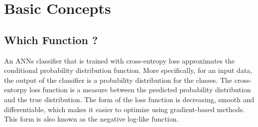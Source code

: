 \documentclass[3p,times,procedia]{elsarticle}
\begin{document}



\enlargethispage{10mm}
\section{\textbf{Basic Concepts}}
\label{main}



\subsection{\textbf{Which Function ?}}

An ANNs classifier that is trained with cross-entropy loss approximates the conditional probability distribution function.
More specifically, for an input data, the output of the classifier is a probability distribution for the classes.
The cross-entorpy loss function is a measure between the predicted probability distribution and the true distribution.
The form of the loss function is decreasing, smooth and differentiable, which makes it easier to optimize using gradient-based methods.
This form is also known as the negative log-like function.


\end{document}
